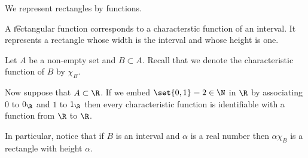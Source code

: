 

We represent rectangles by functions.


A \t{rectangular function} corresponds to a characterstic function of an interval.
It represents a rectangle whose width is the interval and whose height is one.


Let $A$ be a non-empty set and $B \subset A$.
Recall that we denote the characteristic function of $B$ by $\chi _{B}$.

Now suppose that $A \subset \R $.
If we embed $\set{0, 1} = 2 \in \N $ in $\R $ by associating $0$ to $0_{\R }$ and $1$ to $1_{\R }$ then every characteristic function is identifiable with a function from $\R $ to $\R $.

In particular, notice that if $B$ is an interval and $\alpha $ is a real number then $\alpha  \chi _{B}$ is a rectangle with height $\alpha $.

\blankpage
